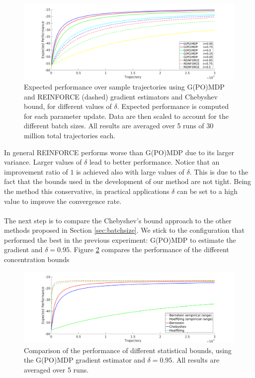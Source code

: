 \begin{figure}[H]
\includegraphics[width = \textwidth]{Images/chebyshev.png}
\caption{Expected performance over sample trajectories using G(PO)MDP and REINFORCE (dashed) gradient estimators and Chebyshev bound, for different values of $\delta$. Expected performance is computed for each parameter update. Data are then scaled to account for the different batch sizes. All results are averaged over 5 runs of 30 million total trajectories each.}
\label{fig:1}
\end{figure}

In general REINFORCE performs worse than G(PO)MDP due to its larger variance.
Larger values of $\delta$  lead to better performance. Notice that an improvement ratio of $1$ is achieved also with large values of $\delta$. This is due to the fact that the bounds used in the development of our method are not tight. Being the method this conservative, in practical applications $\delta$ can be set to a high value to improve the convergence rate.
\paragraph{}
The next step is to compare the Chebyshev's bound approach to the other methods proposed in Section \ref{sec:batchsize}. We stick to the configuration that performed the best in the previous experiment: G(PO)MDP to estimate the gradient and $\delta=0.95$. 
Figure \ref{fig:2} compares the performance of the different concentration bounds

\begin{figure}[H]
\includegraphics[width = \textwidth]{Images/compare_bounds.png}
\caption{Comparison of the performance of different statistical bounds, using the G(PO)MDP gradient estimator and $\delta=0.95$. All results are averaged over 5 runs.}
\label{fig:2}
\end{figure}

